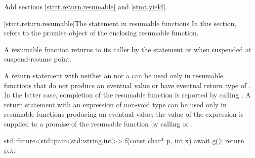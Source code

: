 %
%
%
%
%

Add sections \ref{stmt.return.resumable} and \ref{stmt.yield}.

[stmt.return.resumable]{The  statement in resumable functions}%
\enternote
In this section,  refers to the promise object
of the enclosing resumable function.
\exitnote

\pnum
A resumable function returns to its caller by the  statement
or when suspended at suspend-resume point.

\pnum
A return statement
with neither an  nor a 
can be used only in resumable functions
that do not produce an eventual value or have eventual return type of . In the latter case, completion of the resumable function
is reported by calling .
A return statement with an expression of non-void type can be used only
in resumable functions producing an eventual value; the value of the expression is supplied to a promise of the resumable function by calling 
 or
.

\enterexample

\begin{codeblock}
	std::future<std::pair<std::string,int>> f(const char* p, int x) {
		await g();
		return {p,x};
	}
\end{codeblock}
\exitexample

